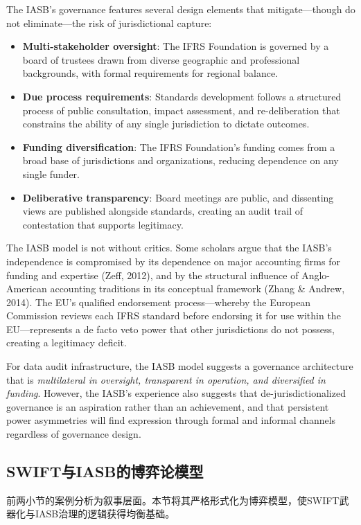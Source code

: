 \documentclass[12pt,a4paper]{ctexart}
\theoremstyle{definition}
\theoremstyle{remark}
\begin{document}
The IASB's governance features several design elements that mitigate—though do not eliminate—the risk of jurisdictional capture:
\begin{itemize}
\item \textbf{Multi-stakeholder oversight}: The IFRS Foundation is governed by a board of trustees drawn from diverse geographic and professional backgrounds, with formal requirements for regional balance.
\item \textbf{Due process requirements}: Standards development follows a structured process of public consultation, impact assessment, and re-deliberation that constrains the ability of any single jurisdiction to dictate outcomes.
\item \textbf{Funding diversification}: The IFRS Foundation's funding comes from a broad base of jurisdictions and organizations, reducing dependence on any single funder.
\item \textbf{Deliberative transparency}: Board meetings are public, and dissenting views are published alongside standards, creating an audit trail of contestation that supports legitimacy.
\end{itemize}

The IASB model is not without critics. Some scholars argue that the IASB's independence is compromised by its dependence on major accounting firms for funding and expertise (Zeff, 2012), and by the structural influence of Anglo-American accounting traditions in its conceptual framework (Zhang \& Andrew, 2014). The EU's qualified endorsement process—whereby the European Commission reviews each IFRS standard before endorsing it for use within the EU—represents a de facto veto power that other jurisdictions do not possess, creating a legitimacy deficit.

For data audit infrastructure, the IASB model suggests a governance architecture that is \textit{multilateral in oversight, transparent in operation, and diversified in funding}. However, the IASB's experience also suggests that de-jurisdictionalized governance is an aspiration rather than an achievement, and that persistent power asymmetries will find expression through formal and informal channels regardless of governance design.

\subsection{SWIFT与IASB的博弈论模型}

前两小节的案例分析为叙事层面。本节将其严格形式化为博弈模型，使SWIFT武器化与IASB治理的逻辑获得均衡基础。
\end{document}
